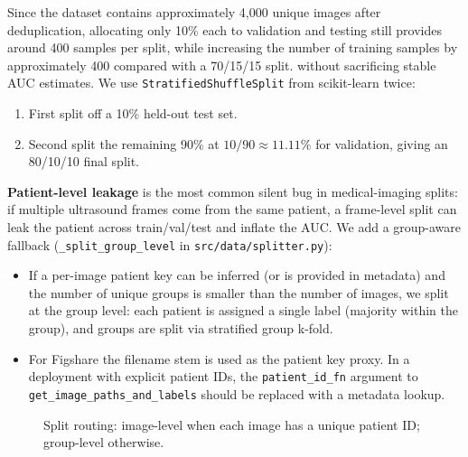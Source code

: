 \documentclass[10pt,a4paper]{article}
\begin{document}
Since the dataset contains approximately 4,000 unique images after deduplication, allocating only 10\% each to validation and testing still provides around 400 samples per split, while increasing the number of training samples by approximately 400 compared with a 70/15/15 split. without sacrificing stable AUC estimates.
We use \texttt{StratifiedShuffleSplit} from scikit-learn twice:

\begin{enumerate}[leftmargin=*]
  \item First split off a 10\% held-out test set.
  \item Second split the remaining 90\% at $10/90 \approx 11.11\%$ for
        validation, giving an 80/10/10 final split.
\end{enumerate}

\textbf{Patient-level leakage} is the most common silent bug in
medical-imaging splits: if multiple ultrasound frames come from the
same patient, a frame-level split can leak the patient across
train/val/test and inflate the AUC. We add a group-aware fallback
(\texttt{\_split\_group\_level} in \texttt{src/data/splitter.py}):

\begin{itemize}[leftmargin=*]
  \item If a per-image patient key can be inferred (or is provided in
        metadata) and the number of unique groups is smaller than the
        number of images, we split at the group level: each patient
        is assigned a single label (majority within the group), and
        groups are split via stratified group k-fold.
  \item For Figshare the filename stem is used as the patient key
        proxy. In a deployment with explicit patient IDs, the
        \texttt{patient\_id\_fn} argument to
        \texttt{get\_image\_paths\_and\_labels} should be replaced
        with a metadata lookup.
\end{itemize}

\begin{figure}[ht]
  \centering
  \caption{Split routing: image-level when each image has a unique
    patient ID; group-level otherwise.}
  \label{fig:split}
\end{figure}
\end{document}
